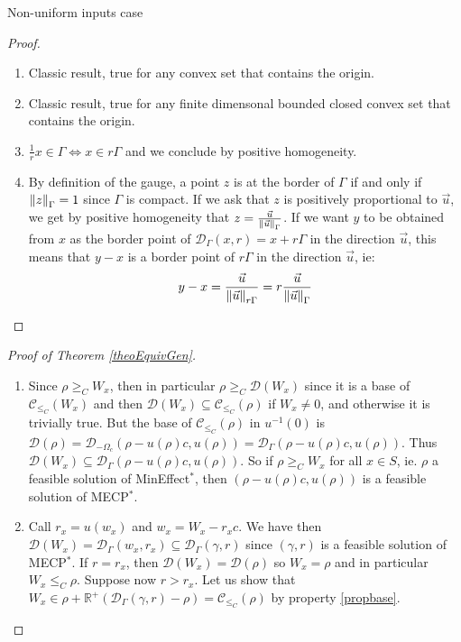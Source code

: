 \documentclass{article}
\theoremstyle{definition}
\theoremstyle{remark}
\begin{document}
\begin{subsubsection}{Non-uniform inputs case}
  \begin{proof}
    \begin{enumerate}
    \item Classic result, true for any convex set that contains the origin.
    \item Classic result, true for any finite dimensonal bounded closed convex set that contains the origin.
    \item $\frac{1}{r}x \in \Gamma \iff x \in r\Gamma$ and we conclude by positive homogeneity.
    \item By definition of the gauge, a point $z$ is at the border of $\Gamma$ if and only if $\norm{z}_{\Gamma}=1$ since $\Gamma$ is compact. If we ask that $z$ is positively proportional to $\vec{u}$, we get by positive homogeneity that $z = \frac{\vec{u}}{\norm{\vec{u}}_{\Gamma}}$. If we want $y$ to be obtained from $x$ as the border point of $\mathcal{D}_{\Gamma}(x,r) = x + r\Gamma$ in the direction $\vec{u}$, this means that $y-x$ is a border point of $r\Gamma$ in the direction $\vec{u}$, ie:
      \[y-x = \frac{\vec{u}}{\norm{\vec{u}}_{r\Gamma}} = r\frac{\vec{u}}{\norm{\vec{u}}_{\Gamma}}\]
    \end{enumerate}
  \end{proof}
  
  \begin{proof}[Proof of Theorem \ref{theoEquivGen}]
    \begin{enumerate}
    \item Since $\rho \geq_C W_x$, then in particular $\rho \geq_C \mathcal{D}(W_x)$ since it is a base of $\mathcal{C}_{\leq_C}(W_x)$ and then $\mathcal{D}(W_x) \subseteq \mathcal{C}_{\leq_C}(\rho)$ if $W_x \not=0$, and otherwise it is trivially true. But the base of $\mathcal{C}_{\leq_C}(\rho)$ in $u^{-1}(0)$ is $\mathcal{D}(\rho) = \mathcal{D}_{-\Omega_c}(\rho - u(\rho)c ,u(\rho)) = \mathcal{D}_{\Gamma}(\rho - u(\rho)c ,u(\rho))$. Thus $\mathcal{D}(W_x) \subseteq \mathcal{D}_{\Gamma}(\rho - u(\rho)c ,u(\rho))$. So if $\rho \geq_C W_x$ for all $x \in S$, ie. $\rho$ a feasible solution of MinEffect$^*$, then $(\rho - u(\rho)c,u(\rho))$ is a feasible solution of MECP$^*$.
      
    \item Call $r_x = u(w_x)$ and $w_x = W_x - r_xc$. We have then $\mathcal{D}(W_x) = \mathcal{D}_{\Gamma}(w_x,r_x) \subseteq \mathcal{D}_{\Gamma}(\gamma,r)$ since $(\gamma,r)$ is a feasible solution of MECP$^*$. If $r=r_x$, then $\mathcal{D}(W_x)=\mathcal{D}(\rho)$ so $W_x=\rho$ and in particular $W_x\leq_C\rho$. Suppose now $r > r_x$. Let us show that $W_x \in \rho+ \mathbb{R}^+(\mathcal{D}_{\Gamma}(\gamma,r)-\rho) = \mathcal{C}_{\leq_C}(\rho)$ by property \ref{propbase}.


\end{enumerate}
\end{proof}
\end{subsubsection}
\end{document}
